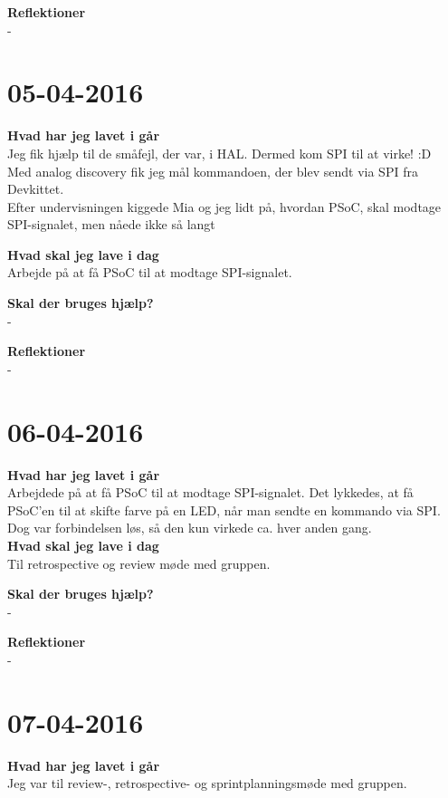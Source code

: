 \documentclass{article}
\begin{document}
	\textbf{Reflektioner}\\
	-
	
	
	\section{05-04-2016}
	
	\textbf{Hvad har jeg lavet i går}\\
	Jeg fik hjælp til de småfejl, der var, i HAL. Dermed kom SPI til at virke! :D \\
	Med analog discovery fik jeg mål kommandoen, der blev sendt via SPI fra Devkittet.\\
	Efter undervisningen kiggede Mia og jeg lidt på, hvordan PSoC, skal modtage SPI-signalet, men nåede ikke så langt
	
	\textbf{Hvad skal jeg lave i dag}\\
	Arbejde på at få PSoC til at modtage SPI-signalet. 
	
	\textbf{Skal der bruges hjælp?}\\
	-
	
	\textbf{Reflektioner}\\
	-	
	
	

	\section{06-04-2016}
	
	\textbf{Hvad har jeg lavet i går}\\
	Arbejdede på at få PSoC til at modtage SPI-signalet. Det lykkedes, at få PSoC'en til at skifte farve på en LED, når man sendte en kommando via SPI. Dog var forbindelsen løs, så den kun virkede ca. hver anden gang.\\
	
	\textbf{Hvad skal jeg lave i dag}\\
	Til retrospective og review møde med gruppen. 
	
	\textbf{Skal der bruges hjælp?}\\
	-
	
	\textbf{Reflektioner}\\
	-
	
	
	
	\section{07-04-2016}
	
	\textbf{Hvad har jeg lavet i går}\\
	Jeg var til review-, retrospective- og sprintplanningsmøde med gruppen.\\
	
\end{document}
